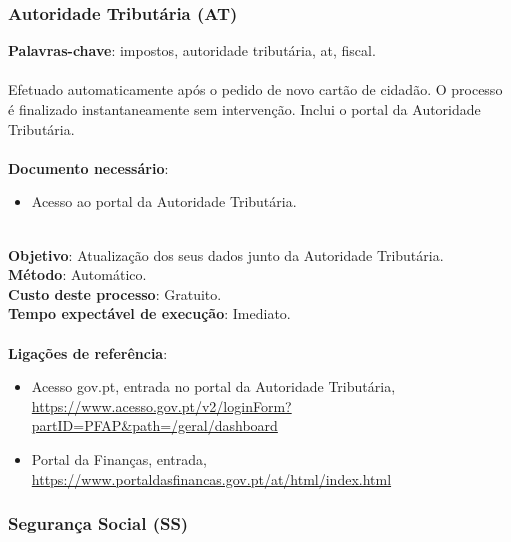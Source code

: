 \subsubsection{Autoridade Tributária (AT)}

\textbf{Palavras-chave}: impostos, autoridade tributária, at, fiscal. \\
\\
Efetuado automaticamente após o pedido de novo cartão de cidadão. O
processo é finalizado instantaneamente sem intervenção. Inclui o portal
da Autoridade Tributária. \\
\\
\textbf{Documento necessário}:
\begin{itemize}
	\item Acesso ao portal da Autoridade Tributária.
\end{itemize}
\leavevmode\\
\textbf{Objetivo}: Atualização dos seus dados junto da Autoridade Tributária. \\
\textbf{Método}: Automático. \\
\textbf{Custo deste processo}: Gratuito. \\
\textbf{Tempo expectável de execução}: Imediato. \\
\\
\textbf{Ligações de referência}:
\begin{itemize}
	\item Acesso gov.pt, entrada no portal da Autoridade Tributária, \url{https://www.acesso.gov.pt/v2/loginForm?partID=PFAP\&path=/geral/dashboard}
	\item Portal da Finanças, entrada, \url{https://www.portaldasfinancas.gov.pt/at/html/index.html}
\end{itemize}

\subsubsection{Segurança Social (SS)}

